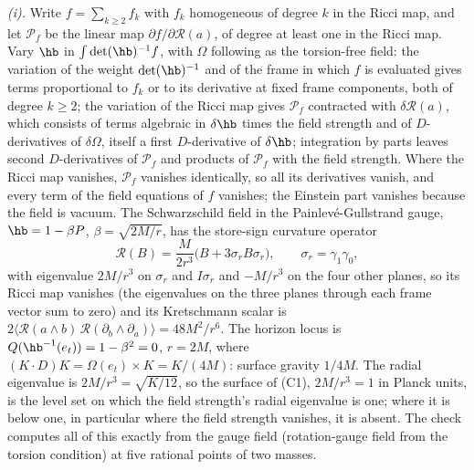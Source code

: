 \emph{(i).} Write $f = \sum_{k \geq 2} f_{k}$ with $f_{k}$ homogeneous of degree $k$ in the Ricci map, and let $\mathcal{P}_{f}$ be the linear map $\partial f/\partial\mathcal{R}(a)$, of degree at least one in the Ricci map. Vary $\hb$ in $\int\det(\hb)^{-1}f$, with $\Omega$ following as the torsion-free field: the variation of the weight $\det(\hb)^{-1}$ and of the frame in which $f$ is evaluated gives terms proportional to $f_{k}$ or to its derivative at fixed frame components, both of degree $k \geq 2$; the variation of the Ricci map gives $\mathcal{P}_{f}$ contracted with $\delta\mathcal{R}(a)$, which consists of terms algebraic in $\delta\hb$ times the field strength and of $D$-derivatives of $\delta\Omega$, itself a first $D$-derivative of $\delta\hb$; integration by parts leaves second $D$-derivatives of $\mathcal{P}_{f}$ and products of $\mathcal{P}_{f}$ with the field strength. Where the Ricci map vanishes, $\mathcal{P}_{f}$ vanishes identically, so all its derivatives vanish, and every term of the field equations of $f$ vanishes; the Einstein part vanishes because the field is vacuum. The Schwarzschild field in the Painlev\'e-Gullstrand gauge, $\hb = 1 - \beta P$, $\beta = \sqrt{2M/r}$, has the store-sign curvature operator
\[
\mathcal{R}(B) = \frac{M}{2r^{3}}\bigl(B + 3\sigma_{r}B\sigma_{r}\bigr), \qquad \sigma_{r} = \gamma_{1}\gamma_{0},
\]
with eigenvalue $2M/r^{3}$ on $\sigma_{r}$ and $I\sigma_{r}$ and $-M/r^{3}$ on the four other planes, so its Ricci map vanishes (the eigenvalues on the three planes through each frame vector sum to zero) and its Kretschmann scalar is $2\langle\mathcal{R}(a \wedge b)\,\mathcal{R}(\partial_{b} \wedge \partial_{a})\rangle = 48M^{2}/r^{6}$. The horizon locus is $Q(\hb^{-1}(e_{t})) = 1 - \beta^{2} = 0$, $r = 2M$, where $(K \cdot D)K = \Omega(e_{t}) \times K = K/(4M)$: surface gravity $1/4M$. The radial eigenvalue is $2M/r^{3} = \sqrt{K/12}$, so the surface of (C1), $2M/r^{3} = 1$ in Planck units, is the level set on which the field strength's radial eigenvalue is one; where it is below one, in particular where the field strength vanishes, it is absent. The check computes all of this exactly from the gauge field (rotation-gauge field from the torsion condition) at five rational points of two masses.

